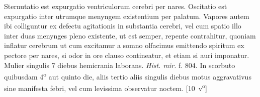 \pend%
\pstart%
Sternutatio est expurgatio ventriculorum cerebri per nares. Oscitatio est expurgatio
inter utrumque menyngem existentium per palatum. Vapores autem ibi colliguntur ex defectu agitationis in substantia cerebri, vel cum spatio illo inter duas menynges pleno existente, ut est semper, repente contrahitur, quoniam inflatur cerebrum ut cum excitamur a somno olfacimus emittendo spiritum ex pectore per nares, si odor in ore clauso contineatur, et etiam si auri imponatur.
\pend%
\pstart%
Mulier singulis 7 diebus hemicrania laborans.
\textit{Hist. mir.} f. 804.
\pend%
\pstart%
In scorbuto quibusdam 4\textsuperscript{o} aut quinto die, aliis tertio aliis singulis diebus motus aggravativus sine manifesta febri, vel cum levissima observatur noctem.
[10~v\textsuperscript{o}]
\pend%
\newpage
